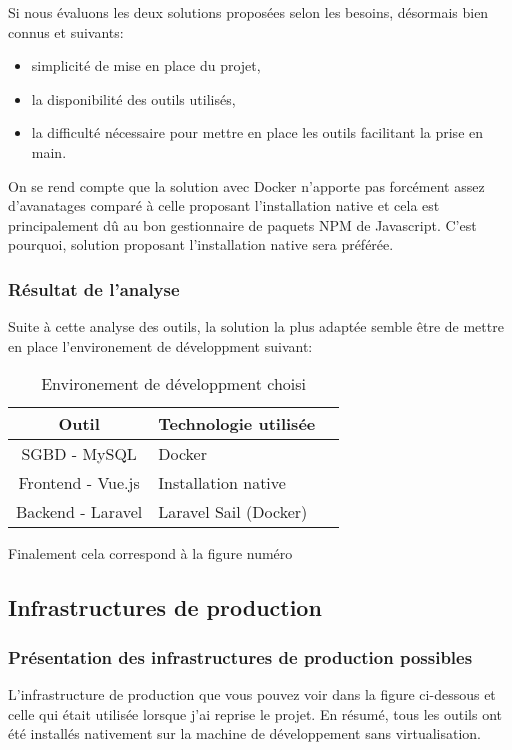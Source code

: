 \documentclass[
    iai, %
    il, %
]{heig-tb}
\begin{document}
Si nous évaluons les deux solutions proposées selon les besoins, désormais bien connus et suivants:
\begin{itemize}
    \item simplicité de mise en place du projet,
    \item la disponibilité des outils utilisés,
    \item la difficulté nécessaire pour mettre en place les outils facilitant la prise en main.
\end{itemize}

On se rend compte que la solution avec Docker n'apporte pas forcément assez d'avanatages comparé à celle proposant l'installation native et cela est principalement dû au bon gestionnaire de paquets NPM de Javascript. C'est pourquoi, solution proposant l'installation native sera préférée.

\subsubsection{Résultat de l'analyse}
Suite à cette analyse des outils, la solution la plus adaptée semble être de mettre en place l'environement de développment suivant:

\begin{table}[h]
    \begin{center}
        \caption{Environement de développment choisi \label{env_dev}}
        \begin{tabular}{c|l|r}
            Outil             & Technologie utilisée  \\ \hline
            SGBD - MySQL      & Docker                \\
            Frontend - Vue.js & Installation native   \\
            Backend - Laravel & Laravel Sail (Docker) \\
        \end{tabular}
    \end{center}
\end{table}


Finalement cela correspond à la figure numéro %

\clearpage
\subsection{Infrastructures de production}

\subsubsection{Présentation des infrastructures de production possibles}
L'infrastructure de production que vous pouvez voir dans la figure ci-dessous et celle qui était utilisée lorsque j'ai reprise le projet.
En résumé, tous les outils ont été installés nativement sur la machine de développement sans virtualisation.
\end{document}
